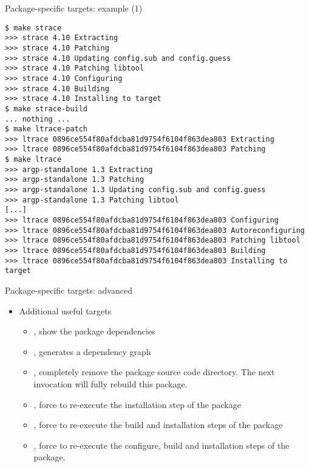 \begin{frame}[fragile]{Package-specific targets: example (1)}

\begin{block}{}
{\tiny
\begin{verbatim}
$ make strace
>>> strace 4.10 Extracting
>>> strace 4.10 Patching
>>> strace 4.10 Updating config.sub and config.guess
>>> strace 4.10 Patching libtool
>>> strace 4.10 Configuring
>>> strace 4.10 Building
>>> strace 4.10 Installing to target
$ make strace-build
... nothing ...
$ make ltrace-patch
>>> ltrace 0896ce554f80afdcba81d9754f6104f863dea803 Extracting
>>> ltrace 0896ce554f80afdcba81d9754f6104f863dea803 Patching
$ make ltrace
>>> argp-standalone 1.3 Extracting
>>> argp-standalone 1.3 Patching
>>> argp-standalone 1.3 Updating config.sub and config.guess
>>> argp-standalone 1.3 Patching libtool
[...]
>>> ltrace 0896ce554f80afdcba81d9754f6104f863dea803 Configuring
>>> ltrace 0896ce554f80afdcba81d9754f6104f863dea803 Autoreconfiguring
>>> ltrace 0896ce554f80afdcba81d9754f6104f863dea803 Patching libtool
>>> ltrace 0896ce554f80afdcba81d9754f6104f863dea803 Building
>>> ltrace 0896ce554f80afdcba81d9754f6104f863dea803 Installing to target
\end{verbatim}}
\end{block}

\end{frame}

\begin{frame}{Package-specific targets: advanced}
  \begin{itemize}
  \item Additional useful targets
    \begin{itemize}
    \item {}, show the package dependencies
    \item {}, generates a dependency graph
    \item {}, completely remove the package
      source code directory. The next  invocation will
      fully rebuild this package.
    \item {}, force to re-execute the
      installation step of the package
    \item {}, force to re-execute the build and
      installation steps of the package
    \item {}, force to re-execute the
      configure, build and installation steps of the package.
    \end{itemize}
  \end{itemize}
\end{frame}


